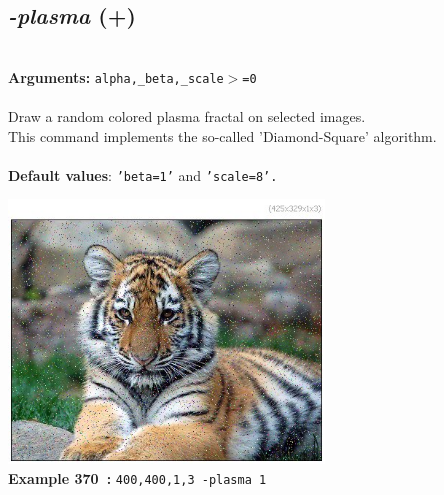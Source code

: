 \documentclass[a4paper,11pt,twoside]{book}
\begin{document}
\subsection{\emph{-plasma} (+)}\vspace*{-0.5em}
~\\\textbf{Arguments: } 
{\small \texttt{alpha,\_beta,\_scale$>$=0}}\\~\\
Draw a random colored plasma fractal on selected images.
~\\This command implements the so-called 'Diamond-Square' algorithm.
~\\~\\\textbf{Default values}: {\small \texttt{'beta=1'} and \texttt{'scale=8'.}}
\begin{center}\includegraphics[keepaspectratio=true,height=7cm,width=\textwidth]{img/gmic_def370.jpg}\\
{\footnotesize \textbf{Example 370~:} \texttt{400,400,1,3 -plasma 1}}
\end{center}
\end{document}
